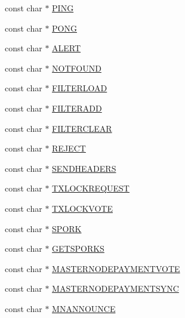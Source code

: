 \begin{DoxyCompactItemize}
\item 
const char $\ast$ \mbox{\hyperlink{namespace_net_msg_type_abcbdc691fe213e3b506205238f6e49aa}{P\+I\+NG}}
\item 
const char $\ast$ \mbox{\hyperlink{namespace_net_msg_type_a0ab71853d397a97e7fb309fd1f718e71}{P\+O\+NG}}
\item 
const char $\ast$ \mbox{\hyperlink{namespace_net_msg_type_a7842a52c9591fef666bb8b02a2951c79}{A\+L\+E\+RT}}
\item 
const char $\ast$ \mbox{\hyperlink{namespace_net_msg_type_a266e360dbaed7a59bad1dd795b62b6d7}{N\+O\+T\+F\+O\+U\+ND}}
\item 
const char $\ast$ \mbox{\hyperlink{namespace_net_msg_type_ab6eeb510444f7d2344d4715ea710b2c4}{F\+I\+L\+T\+E\+R\+L\+O\+AD}}
\item 
const char $\ast$ \mbox{\hyperlink{namespace_net_msg_type_a76b0d59904e55b6389aa7491655a2ef0}{F\+I\+L\+T\+E\+R\+A\+DD}}
\item 
const char $\ast$ \mbox{\hyperlink{namespace_net_msg_type_adb4faffb24cda767d622b38fcd2c1a37}{F\+I\+L\+T\+E\+R\+C\+L\+E\+AR}}
\item 
const char $\ast$ \mbox{\hyperlink{namespace_net_msg_type_a409e4765ed30b351d8dd6229f6cb7aae}{R\+E\+J\+E\+CT}}
\item 
const char $\ast$ \mbox{\hyperlink{namespace_net_msg_type_a6d23d2360224f28cd3211a551ea2ca3b}{S\+E\+N\+D\+H\+E\+A\+D\+E\+RS}}
\item 
const char $\ast$ \mbox{\hyperlink{namespace_net_msg_type_afc8f3eaef85dec53f3c0b247a4caa7e6}{T\+X\+L\+O\+C\+K\+R\+E\+Q\+U\+E\+ST}}
\item 
const char $\ast$ \mbox{\hyperlink{namespace_net_msg_type_aae54808e52ee4282c67808da8f8ea5ec}{T\+X\+L\+O\+C\+K\+V\+O\+TE}}
\item 
const char $\ast$ \mbox{\hyperlink{namespace_net_msg_type_a6b65af6f0ed4fae98cf456e81656afed}{S\+P\+O\+RK}}
\item 
const char $\ast$ \mbox{\hyperlink{namespace_net_msg_type_a541f0df7bbda1b9beb91a07e1bcfba04}{G\+E\+T\+S\+P\+O\+R\+KS}}
\item 
const char $\ast$ \mbox{\hyperlink{namespace_net_msg_type_a511f19a937e55060895c83d4610e3dba}{M\+A\+S\+T\+E\+R\+N\+O\+D\+E\+P\+A\+Y\+M\+E\+N\+T\+V\+O\+TE}}
\item 
const char $\ast$ \mbox{\hyperlink{namespace_net_msg_type_a5e005cd7c5b084cc02f0a3003125fdc6}{M\+A\+S\+T\+E\+R\+N\+O\+D\+E\+P\+A\+Y\+M\+E\+N\+T\+S\+Y\+NC}}
\item 
const char $\ast$ \mbox{\hyperlink{namespace_net_msg_type_a2ca7bfe05d443f7a5d967d0fe3be95e5}{M\+N\+A\+N\+N\+O\+U\+N\+CE}}

\end{DoxyCompactItemize}

